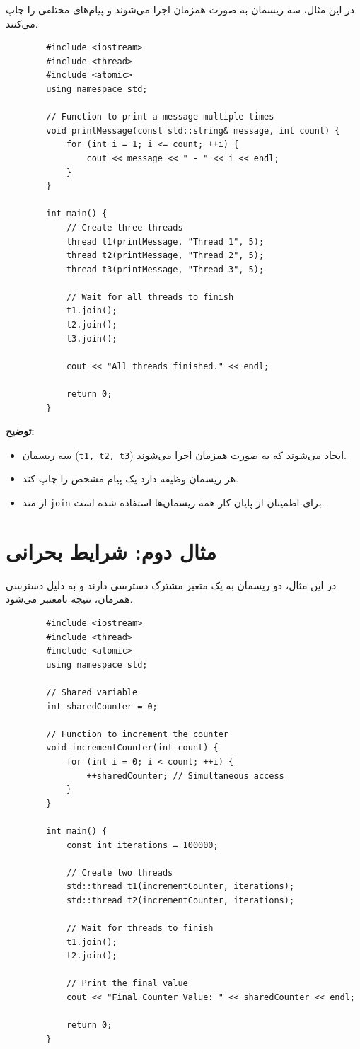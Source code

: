 \documentclass[12pt, a4paper]{report}
\begin{document}
در این مثال، سه ریسمان به صورت همزمان اجرا می‌شوند و پیام‌های مختلفی را چاپ می‌کنند.

\begin{LTR}
	\begin{lstlisting}
		#include <iostream>
		#include <thread>
		#include <atomic>
		using namespace std;
		
		// Function to print a message multiple times
		void printMessage(const std::string& message, int count) {
			for (int i = 1; i <= count; ++i) {
				cout << message << " - " << i << endl;
			}
		}
		
		int main() {
			// Create three threads
			thread t1(printMessage, "Thread 1", 5);
			thread t2(printMessage, "Thread 2", 5);
			thread t3(printMessage, "Thread 3", 5);
			
			// Wait for all threads to finish
			t1.join();
			t2.join();
			t3.join();
			
			cout << "All threads finished." << endl;
			
			return 0;
		}
	\end{lstlisting}
\end{LTR}

\textbf{توضیح:}
\begin{itemize}
	\item سه ریسمان (\texttt{t1, t2, t3}) ایجاد می‌شوند که به صورت همزمان اجرا می‌شوند.
	\item هر ریسمان وظیفه دارد یک پیام مشخص را چاپ کند.
	\item از متد \texttt{join} برای اطمینان از پایان کار همه ریسمان‌ها استفاده شده است.
\end{itemize}

\section{مثال دوم: شرایط بحرانی}

در این مثال، دو ریسمان به یک متغیر مشترک دسترسی دارند و به دلیل دسترسی همزمان، نتیجه نامعتبر می‌شود.

\begin{LTR}
	\begin{lstlisting}
		#include <iostream>
		#include <thread>
		#include <atomic>
		using namespace std;
		
		// Shared variable
		int sharedCounter = 0;
		
		// Function to increment the counter
		void incrementCounter(int count) {
			for (int i = 0; i < count; ++i) {
				++sharedCounter; // Simultaneous access
			}
		}
		
		int main() {
			const int iterations = 100000;
			
			// Create two threads
			std::thread t1(incrementCounter, iterations);
			std::thread t2(incrementCounter, iterations);
			
			// Wait for threads to finish
			t1.join();
			t2.join();
			
			// Print the final value
			cout << "Final Counter Value: " << sharedCounter << endl;
			
			return 0;
		}
	\end{lstlisting}
\end{LTR}
\end{document}
